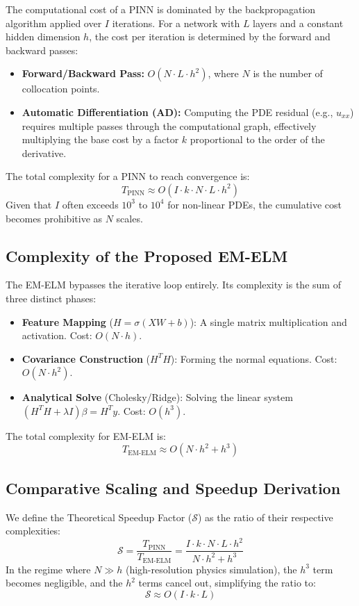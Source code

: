 \documentclass[final,12pt,3p,times,fleqn]{elsarticle}
\begin{document}
The computational cost of a PINN is dominated by the backpropagation algorithm applied over $I$ iterations. For a network with $L$ layers and a constant hidden dimension $h$, the cost per iteration is determined by the forward and backward passes:
\begin{itemize}
    \item \textbf{Forward/Backward Pass:} $O(N \cdot L \cdot h^2)$, where $N$ is the number of collocation points.
    \item \textbf{Automatic Differentiation (AD):} Computing the PDE residual (e.g., $u_{xx}$) requires multiple passes through the computational graph, effectively multiplying the base cost by a factor $k$ proportional to the order of the derivative.
\end{itemize}
The total complexity for a PINN to reach convergence is:
$$T_{\text{PINN}} \approx O(I \cdot k \cdot N \cdot L \cdot h^2)$$
Given that $I$ often exceeds $10^3$ to $10^4$ for non-linear PDEs, the cumulative cost becomes prohibitive as $N$ scales.

\subsection{Complexity of the Proposed EM-ELM}

The EM-ELM bypasses the iterative loop entirely. Its complexity is the sum of three distinct phases:
\begin{itemize}
    \item \textbf{Feature Mapping} ($H = \sigma(XW+b)$): A single matrix multiplication and activation. Cost: $O(N \cdot h)$.
    \item \textbf{Covariance Construction} ($H^T H$): Forming the normal equations. Cost: $O(N \cdot h^2)$.
    \item \textbf{Analytical Solve} (Cholesky/Ridge): Solving the linear system $(H^T H + \lambda I)\beta = H^T y$. Cost: $O(h^3)$.
\end{itemize}
The total complexity for EM-ELM is:
$$T_{\text{EM-ELM}} \approx O(N \cdot h^2 + h^3)$$

\subsection{Comparative Scaling and Speedup Derivation}

We define the Theoretical Speedup Factor ($\mathcal{S}$) as the ratio of their respective complexities:
$$\mathcal{S} = \frac{T_{\text{PINN}}}{T_{\text{EM-ELM}}} = \frac{I \cdot k \cdot N \cdot L \cdot h^2}{N \cdot h^2 + h^3}$$
In the regime where $N \gg h$ (high-resolution physics simulation), the $h^3$ term becomes negligible, and the $h^2$ terms cancel out, simplifying the ratio to:
$$\mathcal{S} \approx O(I \cdot k \cdot L)$$
\end{document}
